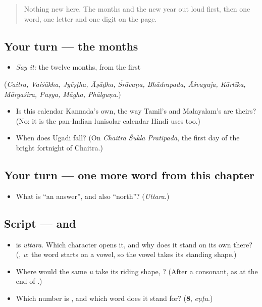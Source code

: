 \begin{quote}
Nothing new here. The months and the new year out loud first, then one word, one letter and one digit on the page.
\end{quote}

\subsection*{Your turn — the months}
\begin{itemize}
\raggedright
  \item \emph{Say it:} the twelve months, from the first
\end{itemize}

(\emph{Caitra, Vaiśākha, Jyēṣṭha, Āṣāḍha, Śrāvaṇa, Bhādrapada, Āśvayuja, Kārtīka, Mārgaśira, Puṣya, Māgha, Phālguṇa}.)

\begin{itemize}
\raggedright
  \item Is this calendar Kannada's own, the way Tamil's and Malayalam's are theirs? (No: it is the pan-Indian lunisolar calendar Hindi uses too.)
  \item When does Ugadi fall? (On \emph{Chaitra Śukla Pratipada}, the first day of the bright fortnight of Chaitra.)
\end{itemize}

\subsection*{Your turn — one more word from this chapter}
\begin{itemize}
\raggedright
  \item What is \textquotedblleft{}an answer\textquotedblright{}, and also \textquotedblleft{}north\textquotedblright{}? (\emph{Uttara}.)
\end{itemize}

\subsection*{Script —  and }
\begin{itemize}
\raggedright
  \item \textbf{} is \emph{uttara}. Which character opens it, and why does it stand on its own there? (\textbf{}, \emph{u}: the word starts on a vowel, so the vowel takes its standing shape.)
  \item Where would the same \emph{u} take its riding shape, \textbf{}? (After a consonant, as at the end of \textbf{}.)
  \item Which number is \textbf{}, and which word does it stand for? (\textbf{8}, \emph{eṇṭu}.)
\end{itemize}

